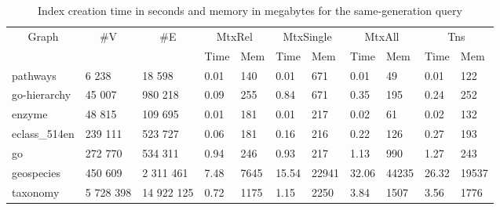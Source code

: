 \begin{table*}[t]
	{
		\caption{Index creation time in seconds and memory in megabytes for the same-generation query}
		\label{tbl:index_creation}
		\small
		\begin{tabular}{|l|l|l|l|l|l|l|l|l|l|l|}
			\hline
			\multicolumn{1}{|c|}{\multirow{2}{*}{Graph}} & \multicolumn{1}{c|}{\multirow{2}{*}{\#V}} & \multicolumn{1}{c|}{\multirow{2}{*}{\#E}} &  \multicolumn{2}{c|}{MtxRel} & \multicolumn{2}{c|}{MtxSingle} & \multicolumn{2}{c|}{MtxAll} & \multicolumn{2}{c|}{Tns} \\ \cline{4-11} 
			\multicolumn{1}{|c|}{}                       & \multicolumn{1}{c|}{}                     & \multicolumn{1}{c|}{}                     & Time         & Mem          & Time        & Mem        & Time           & Mem           & Time         & Mem    \\ \hline
			pathways                                     & 6 238                                     & 18 598 & 0.01         & 140  & 0.01           & 671 & 0.01         & 49           & 0.01        & 122               \\ \hline
			go-hierarchy                                 & 45 007                                    & 980 218                                   & 0.09         & 255 & 0.84           & 671 & 0.35        & 195        & 0.24        & 252                             \\ \hline
			enzyme                                       & 48 815                                    & 109 695                                   & 0.01         & 181 & 0.01           & 217 & 0.02         & 61           & 0.02        & 132                            \\ \hline
			eclass\_514en                                & 239 111                                   & 523 727                                   & 0.06         & 181 & 0.16           & 216    & 0.22         & 126          & 0.27        & 193                         \\ \hline
			go                                           & 272 770                                   & 534 311                                   & 0.94         & 246  & 0.93           & 217  & 1.13         & 990          & 1.27        & 243                          \\ \hline
			geospecies & 450 609                                   & 2 311 461 & 7.48         & 7645     & 15.54          & 22941 & 32.06        & 44235        & 26.32       & 19537 \\ \hline
			taxonomy                                     & 5 728 398                                 & 14 922 125                            & 0.72         & 1175      & 1.15           & 2250    & 3.84        & 1507        & 3.56        & 1776                   \\ \hline
		\end{tabular}
	}
\end{table*}

